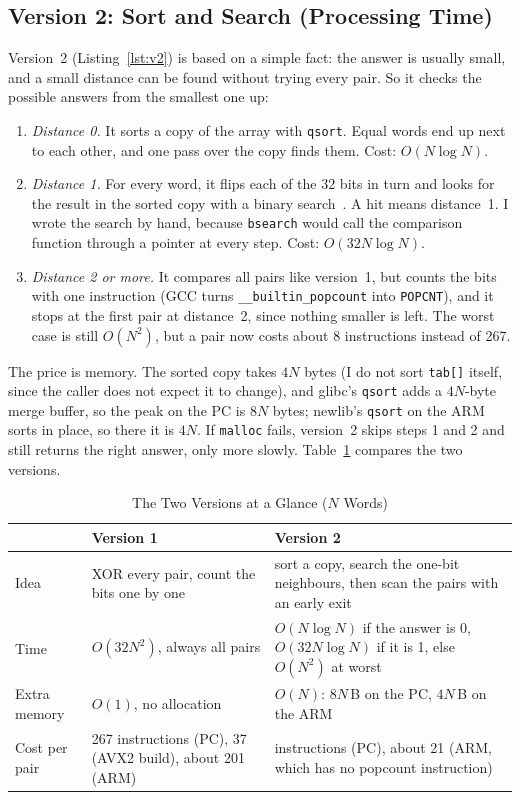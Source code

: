 \documentclass[conference,a4paper]{IEEEtran}
\newcommand{\code}[1]{\texttt{#1}}
\begin{document}
\subsection{Version 2: Sort and Search (Processing Time)}
Version~2 (Listing~\ref{lst:v2}) is based on a simple fact: the answer is
usually small, and a small distance can be found without trying every pair. So
it checks the possible answers from the smallest one up:
\begin{enumerate}
\item \emph{Distance 0.} It sorts a copy of the array with \code{qsort}. Equal
  words end up next to each other, and one pass over the copy finds them.
  Cost: $O(N\log N)$.
\item \emph{Distance 1.} For every word, it flips each of the 32 bits in turn and
  looks for the result in the sorted copy with a binary search~\cite{knuth3}. A
  hit means distance~1. I wrote the search by hand, because \code{bsearch} would
  call the comparison function through a pointer at every step.
  Cost: $O(32N\log N)$.
\item \emph{Distance 2 or more.} It compares all pairs like version~1, but counts
  the bits with one instruction (GCC turns \code{\_\_builtin\_popcount} into
  \code{POPCNT}), and it stops at the first pair at distance~2,
  since nothing smaller is left. The worst case is still $O(N^2)$, but a pair
  now costs about 8 instructions instead of 267.
\end{enumerate}

The price is memory. The sorted copy takes $4N$ bytes (I do not sort
\code{tab[]} itself, since the caller does not expect it to change), and glibc's
\code{qsort} adds a $4N$-byte merge buffer, so the peak on the PC is $8N$ bytes;
newlib's \code{qsort} on the ARM sorts in place, so there it is $4N$. If
\code{malloc} fails, version~2 skips steps 1 and 2 and still returns the right
answer, only more slowly. Table~\ref{tab:versions} compares the two versions.

\begin{table}[!t]
\caption{The Two Versions at a Glance ($N$ Words)}
\label{tab:versions}
\centering\footnotesize{}
\setlength{\tabcolsep}{3pt}
\begin{tabularx}{\columnwidth}{@{}>{\raggedright}p{1.3cm}>{\raggedright}X>{\raggedright\arraybackslash}X@{}}
\toprule
 & \textbf{Version 1} & \textbf{Version 2} \\
\midrule
Idea & XOR every pair, count the bits one by one
     & sort a copy, search the one-bit neighbours, then scan the pairs with an
       early exit \\
Time & $O(32N^2)$, always all pairs
     & $O(N\log N)$ if the answer is 0, $O(32N\log N)$ if it is 1, else $O(N^2)$
       at worst \\
Extra memory & $O(1)$, no allocation
     & $O(N)$: $8N$\,B on the PC, $4N$\,B on the ARM \\
Cost per pair & 267 instructions (PC), 37 (AVX2 build), about 201 (ARM)
     & 8 instructions (PC), about 21 (ARM, which has no popcount instruction) \\
\bottomrule
\end{tabularx}
\end{table}
\end{document}
